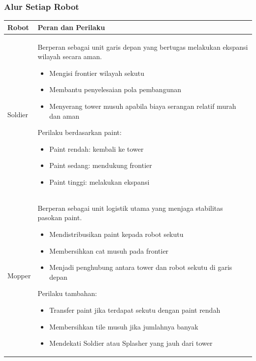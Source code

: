 \documentclass{article}
\renewcommand{\arraystretch}{1.3}
\begin{document}
\subsubsection{Alur Setiap Robot}
\begin{table}[H]
\centering
\renewcommand{\arraystretch}{1.2}
\begin{tabular}{|p{3cm}|p{11cm}|}
\hline
\textbf{Robot} & \textbf{Peran dan Perilaku} \\
\hline

Soldier &
Berperan sebagai unit garis depan yang bertugas melakukan ekspansi wilayah secara aman.
\begin{itemize}[leftmargin=*, nosep]
\item Mengisi frontier wilayah sekutu
\item Membantu penyelesaian pola pembangunan
\item Menyerang tower musuh apabila biaya serangan relatif murah dan aman
\end{itemize}

Perilaku berdasarkan paint:
\begin{itemize}[leftmargin=*, nosep]
\item Paint rendah: kembali ke tower
\item Paint sedang: mendukung frontier
\item Paint tinggi: melakukan ekspansi
\end{itemize}
\\
\hline

Mopper &
Berperan sebagai unit logistik utama yang menjaga stabilitas pasokan paint.
\begin{itemize}[leftmargin=*, nosep]
\item Mendistribusikan paint kepada robot sekutu
\item Membersihkan cat musuh pada frontier
\item Menjadi penghubung antara tower dan robot sekutu di garis depan
\end{itemize}

Perilaku tambahan:
\begin{itemize}[leftmargin=*, nosep]
\item Transfer paint jika terdapat sekutu dengan paint rendah
\item Membersihkan tile musuh jika jumlahnya banyak
\item Mendekati Soldier atau Splasher yang jauh dari tower
\end{itemize}
\\
\hline


\end{tabular}
\end{table}
\end{document}
